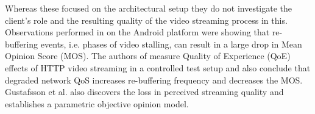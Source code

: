 Whereas these focused on the architectural setup they do not investigate the client's role and the resulting quality of the video streaming process in this. 
Observations performed in \cite{ketyko2010qoe} on the Android platform were showing that re-buffering events, i.e. phases of video stalling, can result in a large drop in Mean Opinion Score (MOS). The authors of \cite{mokmeasuring} measure Quality of Experience (QoE) effects of HTTP video streaming in a controlled test setup and also conclude that degraded network QoS increases re-buffering frequency and decreases the MOS. Gustafsson et al. \cite{gustafsson2008measuring} also discovers the loss in perceived streaming quality and establishes a parametric objective opinion model.




